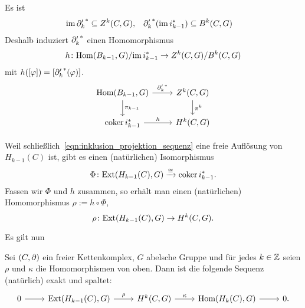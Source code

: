 \begin{lemma}
\label{thm:induzierter_hom_lemma}
  Es ist
  \begin{align*}
    \operatorname{im} {\partial'_k}^* & \subseteq Z^k(C,G), & {\partial'_k}^* (\operatorname{im} i_{k-1}^*) & \subseteq B^k(C,G)
  \end{align*}
  Deshalb induziert ${\partial'_k}^*$ einen Homomorphismus
  \begin{equation*}
    h\colon \mathrm{Hom}(B_{k-1},G) / {\operatorname{im} i_{k-1}^*} \to Z^k(C,G) / {B^k(C,G)}
  \end{equation*}
  mit $h([\varphi]) = [{\partial'_k}^*(\varphi)]$.
  \begin{equation*}
    \begin{tikzcd}
      \Hom(B_{k-1},G)   \arrow{d}{\pi_{k-1}}
                        \arrow{r}{{\del'_k}^*}  & Z^k(C,G) \arrow{d}{\pi^k}\\
      \coker i_{k-1}^*  \arrow{r}{h}            & H^k(C,G)
    \end{tikzcd}
  \end{equation*}
\end{lemma}
\begin{vorbereitung}
  Weil schließlich~\eqref{eqn:inklusion_projektion_sequenz} eine freie Auflösung von $H_{k-1}(C)$ ist, gibt es einen (natürlichen) Isomorphismus
  \begin{equation*}
    \Phi \colon \mathrm{Ext}(H_{k-1}(C),G) \xrightarrow{\cong} \operatorname{coker} i_{k-1}^*.
  \end{equation*}
  Fassen wir $\Phi$ und $h$ zusammen, so erhält man einen (natürlichen) Homomorphismus $\rho := h \circ \Phi$,
  \begin{equation*}
    \rho \colon \mathrm{Ext}(H_{k-1}(C),G) \to H^k(C,G).
  \end{equation*}
\end{vorbereitung}
Es gilt nun
\begin{satz}
  Sei $(C,\partial)$ ein freier Kettenkomplex, $G$ abelsche Gruppe und für jedes $k \in \mathbb{Z}$ seien $\rho$ und $\kappa$ die Homomorphismen von oben.
  Dann ist die folgende Sequenz (natürlich) exakt und spaltet:
  \begin{equation*}
    \begin{tikzcd}
      0 \arrow{r}{} & \Ext(H_{k-1}(C),G)  \arrow{r}{\rho} & H^k(C,G)  \arrow{r}{\kappa} & \Hom(H_k(C),G)  \arrow{r}{} & 0.
    \end{tikzcd}
  \end{equation*}
\end{satz}
